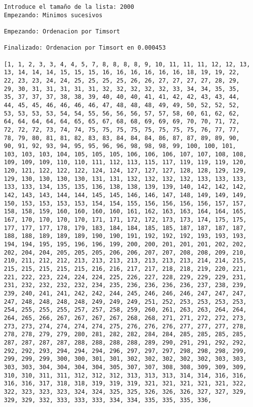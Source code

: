 \documentclass[11pt]{article}
\begin{document}
    \begin{Verbatim}[commandchars=\\\{\}]
Introduce el tamaño de la lista: 2000
Empezando: Minimos sucesivos 

Empezando: Ordenacion por Timsort 

Finalizado: Ordenacion por Timsort en 0.000453 

[1, 1, 2, 3, 3, 4, 4, 5, 7, 8, 8, 8, 8, 9, 10, 11, 11, 11, 12, 12, 13, 13, 14, 14, 14, 15, 15, 15, 16, 16, 16, 16, 16, 16, 18, 19, 19, 22, 22, 23, 23, 24, 24, 25, 25, 25, 25, 26, 26, 27, 27, 27, 27, 28, 29, 29, 30, 31, 31, 31, 31, 31, 32, 32, 32, 32, 32, 33, 34, 34, 35, 35, 35, 37, 37, 37, 38, 38, 39, 40, 40, 40, 41, 41, 42, 42, 43, 43, 44, 44, 45, 45, 46, 46, 46, 46, 47, 48, 48, 48, 49, 49, 50, 52, 52, 52, 53, 53, 53, 53, 54, 54, 55, 56, 56, 56, 57, 57, 58, 60, 61, 62, 62, 64, 64, 64, 64, 64, 65, 65, 67, 68, 68, 69, 69, 69, 70, 70, 71, 72, 72, 72, 72, 73, 74, 74, 75, 75, 75, 75, 75, 75, 75, 75, 76, 77, 77, 78, 79, 80, 81, 81, 82, 83, 83, 84, 84, 84, 86, 87, 87, 89, 89, 90, 90, 91, 92, 93, 94, 95, 95, 96, 96, 98, 98, 98, 99, 100, 100, 101, 103, 103, 103, 104, 105, 105, 105, 106, 106, 106, 107, 107, 108, 108, 109, 109, 109, 110, 110, 111, 112, 113, 115, 117, 119, 119, 119, 120, 120, 121, 122, 122, 122, 124, 124, 127, 127, 127, 128, 128, 129, 129, 129, 130, 130, 130, 130, 131, 131, 132, 132, 132, 132, 133, 133, 133, 133, 133, 134, 135, 135, 136, 138, 138, 139, 139, 140, 142, 142, 142, 142, 143, 143, 144, 144, 145, 145, 146, 146, 147, 148, 149, 149, 149, 150, 153, 153, 153, 153, 154, 154, 155, 156, 156, 156, 156, 157, 157, 158, 158, 159, 160, 160, 160, 160, 161, 162, 163, 163, 164, 164, 165, 167, 170, 170, 170, 170, 171, 171, 172, 172, 173, 173, 174, 175, 175, 177, 177, 177, 178, 179, 183, 184, 184, 185, 185, 187, 187, 187, 187, 188, 188, 189, 189, 189, 190, 190, 191, 192, 192, 192, 193, 193, 193, 194, 194, 195, 195, 196, 196, 199, 200, 200, 201, 201, 201, 202, 202, 202, 204, 204, 205, 205, 205, 206, 206, 207, 207, 208, 208, 209, 210, 210, 211, 212, 212, 213, 213, 213, 213, 213, 213, 213, 214, 214, 215, 215, 215, 215, 215, 215, 216, 216, 217, 217, 218, 218, 219, 220, 221, 221, 222, 223, 224, 224, 224, 225, 226, 227, 228, 229, 229, 229, 231, 231, 232, 232, 232, 232, 234, 235, 236, 236, 236, 236, 237, 238, 239, 239, 240, 241, 241, 242, 242, 244, 245, 246, 246, 246, 247, 247, 247, 247, 248, 248, 248, 248, 249, 249, 249, 251, 252, 253, 253, 253, 253, 254, 255, 255, 255, 257, 257, 258, 259, 260, 261, 263, 263, 264, 264, 264, 265, 266, 267, 267, 267, 267, 268, 268, 271, 271, 272, 272, 273, 273, 273, 274, 274, 274, 274, 275, 276, 276, 276, 277, 277, 277, 278, 278, 278, 279, 279, 280, 281, 282, 282, 284, 284, 285, 285, 285, 285, 287, 287, 287, 287, 288, 288, 288, 288, 289, 290, 291, 291, 292, 292, 292, 292, 293, 294, 294, 294, 296, 297, 297, 297, 298, 298, 298, 299, 299, 299, 299, 300, 300, 301, 301, 302, 302, 302, 302, 302, 303, 303, 303, 303, 304, 304, 304, 304, 305, 307, 307, 308, 308, 309, 309, 309, 310, 310, 311, 311, 312, 312, 312, 313, 313, 313, 314, 314, 316, 316, 316, 316, 317, 318, 318, 319, 319, 319, 321, 321, 321, 321, 321, 322, 322, 323, 323, 323, 324, 324, 325, 325, 326, 326, 326, 327, 327, 329, 329, 329, 332, 333, 333, 333, 334, 334, 335, 335, 335, 336, 
\end{Verbatim}
\end{document}

